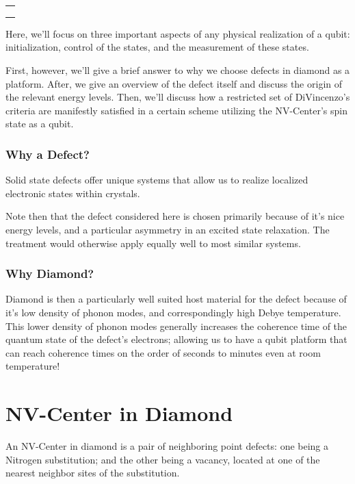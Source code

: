 \documentclass[10pt,a4paper]{article}
\newenvironment{boxed2}
    {\begin{center}
    \begin{tabular}{|p{0.455\textwidth}|}
    \hline\\
    }
    { 
    \\\\\hline
    \end{tabular} 
    \end{center}
    }
\begin{document}
\begin{multicols}{2}
\begin{boxed2}
\vspace{-.4cm}
\end{boxed2}
Here, we'll focus on three important aspects of any physical realization of a qubit: initialization, control of the states, and the measurement of these states.

First, however, we'll give a brief answer to why we choose defects in diamond as a platform. After, we give an overview of the defect itself and discuss the origin of the relevant energy levels.
Then, we'll discuss how a restricted set of DiVincenzo's criteria are manifestly satisfied in a certain scheme utilizing the NV-Center's spin state as a qubit.

\subsubsection*{Why a Defect?}
Solid state defects offer unique systems that allow us to realize localized electronic states within crystals.

Note then that the defect considered here is chosen primarily because of it's nice energy levels, and a particular asymmetry in an excited state relaxation. The treatment would otherwise apply equally well to most similar systems. 

\subsubsection*{Why Diamond?}
Diamond is then a particularly well suited host material for the defect because of it's low density of phonon modes, and correspondingly high Debye temperature. This lower density of phonon modes generally increases the coherence time of the quantum state of the defect's electrons; allowing us to have a qubit platform that can reach coherence times on the order of seconds to minutes even at room temperature!


\section{NV-Center in Diamond}
An NV-Center in diamond is a pair of neighboring point defects: one being a Nitrogen substitution; and the other being a vacancy, located at one of the nearest neighbor sites of the substitution.

\begin{center}


\end{center}
\end{multicols}
\end{document}
